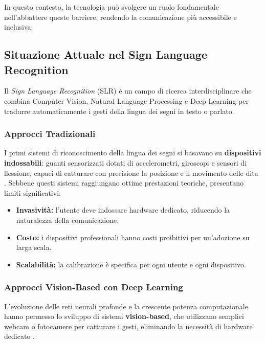 In questo contesto, la tecnologia può svolgere un ruolo fondamentale nell'abbattere queste barriere, rendendo la comunicazione più accessibile e inclusiva.


\subsection{Situazione Attuale nel Sign Language Recognition}

Il \textit{Sign Language Recognition} (SLR) è un campo di ricerca interdisciplinare che combina Computer Vision, Natural Language Processing e Deep Learning per tradurre automaticamente i gesti della lingua dei segni in testo o parlato.

\subsubsection{Approcci Tradizionali}

I primi sistemi di riconoscimento della lingua dei segni si basavano su \textbf{dispositivi indossabili}: guanti sensorizzati dotati di accelerometri, giroscopi e sensori di flessione, capaci di catturare con precisione la posizione e il movimento delle dita \cite{kumar2024slr}. Sebbene questi sistemi raggiungano ottime prestazioni teoriche, presentano limiti significativi:
\begin{itemize}
    \item \textbf{Invasività:} l'utente deve indossare hardware dedicato, riducendo la naturalezza della comunicazione.
    \item \textbf{Costo:} i dispositivi professionali hanno costi proibitivi per un'adozione su larga scala.
    \item \textbf{Scalabilità:} la calibrazione è specifica per ogni utente e ogni dispositivo.
\end{itemize}

\subsubsection{Approcci Vision-Based con Deep Learning}

L'evoluzione delle reti neurali profonde e la crescente potenza computazionale hanno permesso lo sviluppo di sistemi \textbf{vision-based}, che utilizzano semplici webcam o fotocamere per catturare i gesti, eliminando la necessità di hardware dedicato \cite{rastgoo2024slrsurvey}.

